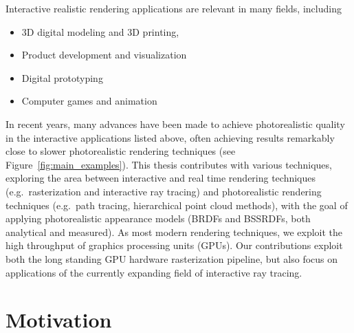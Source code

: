 Interactive realistic rendering applications are relevant in many fields, including
\begin{itemize}
\item 3D digital modeling and 3D printing,
\item Product development and visualization
\item Digital prototyping
\item Computer games and animation
\end{itemize}
In recent years, many advances have been made to achieve photorealistic quality in the interactive applications listed above, often achieving results remarkably close to slower photorealistic rendering techniques (see Figure~\ref{fig:main_examples}). This thesis contributes with various techniques, exploring the area between interactive and real time rendering techniques (e.g.\ rasterization and interactive ray tracing) and photorealistic rendering techniques (e.g.\ path tracing, hierarchical point cloud methods), with the goal of applying photorealistic appearance models (BRDFs and BSSRDFs, both analytical and measured). As most modern rendering techniques, we exploit the high throughput of graphics processing units (GPUs). Our contributions exploit both the long standing GPU hardware rasterization pipeline, but also focus on applications of the currently expanding field of interactive ray tracing. 

\section{Motivation}

